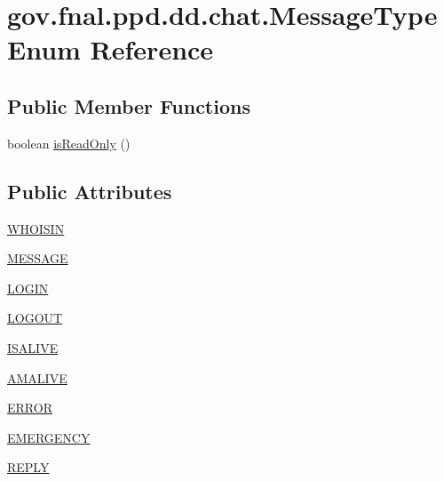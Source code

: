 \hypertarget{enumgov_1_1fnal_1_1ppd_1_1dd_1_1chat_1_1MessageType}{\section{gov.\-fnal.\-ppd.\-dd.\-chat.\-Message\-Type Enum Reference}
\label{enumgov_1_1fnal_1_1ppd_1_1dd_1_1chat_1_1MessageType}
}
\subsection*{Public Member Functions}
\begin{DoxyCompactItemize}
\item 
boolean \hyperlink{enumgov_1_1fnal_1_1ppd_1_1dd_1_1chat_1_1MessageType_a2c94285479ccb82fb2ffe50d2900605a}{is\-Read\-Only} ()
\end{DoxyCompactItemize}
\subsection*{Public Attributes}
\begin{DoxyCompactItemize}
\item 
\hyperlink{enumgov_1_1fnal_1_1ppd_1_1dd_1_1chat_1_1MessageType_aaed6083ff4a292a4ea95ef09c8cc0989}{W\-H\-O\-I\-S\-I\-N}
\item 
\hyperlink{enumgov_1_1fnal_1_1ppd_1_1dd_1_1chat_1_1MessageType_a959fbbd3acc7337c34fefdab32951384}{M\-E\-S\-S\-A\-G\-E}
\item 
\hyperlink{enumgov_1_1fnal_1_1ppd_1_1dd_1_1chat_1_1MessageType_a8d27be5a9d764efc7aaa4d655bb7a30a}{L\-O\-G\-I\-N}
\item 
\hyperlink{enumgov_1_1fnal_1_1ppd_1_1dd_1_1chat_1_1MessageType_aba9c716304ccdd40f9c477bd551c6176}{L\-O\-G\-O\-U\-T}
\item 
\hyperlink{enumgov_1_1fnal_1_1ppd_1_1dd_1_1chat_1_1MessageType_a2ed9c72efc8c9e99324aea4b5ee48b22}{I\-S\-A\-L\-I\-V\-E}
\item 
\hyperlink{enumgov_1_1fnal_1_1ppd_1_1dd_1_1chat_1_1MessageType_aed446af88466c871fc01970edcaf84dd}{A\-M\-A\-L\-I\-V\-E}
\item 
\hyperlink{enumgov_1_1fnal_1_1ppd_1_1dd_1_1chat_1_1MessageType_ad16db5c68a6e9d71810ee9662e9dcf73}{E\-R\-R\-O\-R}
\item 
\hyperlink{enumgov_1_1fnal_1_1ppd_1_1dd_1_1chat_1_1MessageType_a8d59ce28c421afbc1ef0172b13f8b2eb}{E\-M\-E\-R\-G\-E\-N\-C\-Y}
\item 
\hyperlink{enumgov_1_1fnal_1_1ppd_1_1dd_1_1chat_1_1MessageType_a6ef4f1adf848fa896983c37f6f4c213d}{R\-E\-P\-L\-Y}
\end{DoxyCompactItemize}


